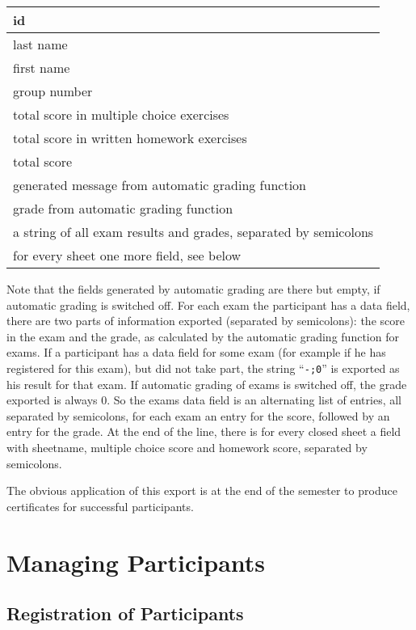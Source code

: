 \documentclass[12pt,openany,a4paper]{book}
\begin{document}
\begin{center}
\begin{tabular}{|l|}
\hline
id \\ \hline
last name \\ \hline
first name \\ \hline
group number \\ \hline
total score in multiple choice exercises \\ \hline
total score in written homework exercises \\ \hline
total score \\ \hline
generated message from automatic grading function \\ \hline
grade from automatic grading function \\ \hline
a string of all exam results and grades, separated by semicolons \\ \hline
for every sheet one more field, see below \\ \hline
\end{tabular}
\end{center}

Note that the fields generated by automatic grading are there but empty, if 
automatic grading is switched off. For each exam the participant has a data
field, there are two parts of information exported (separated by
semicolons): the score in the exam and the grade, as calculated by the
automatic grading function for exams. If a participant has a data field for
some exam (for example if he has registered for this exam), but did not
take part, the string ``\texttt{-;0}'' is exported as his result for
that exam. If automatic grading of exams is switched off, the grade
exported is always 0. So the exams data field is an alternating list of
entries, all separated by semicolons, for each exam an entry for the
score, followed by an entry for the grade. At the end of the line, there
is for every closed sheet a field with sheetname, multiple choice score
and homework score, separated by semicolons.

The obvious application of this export is at the
end of the semester to produce certificates for successful participants.


\chapter{Managing Participants}\label{ch:managepeople}

\section{Registration of Participants}
\end{document}
